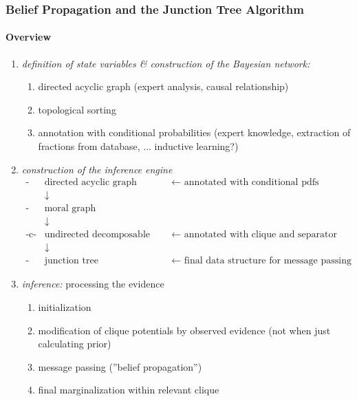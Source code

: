 
\subsubsection{Belief Propagation and the Junction Tree Algorithm}
\paragraph{Overview}
\begin{enumerate}[(1)]
\item  \emph{definition of state variables \& construction of the Bayesian network:}
\begin{enumerate}[-a-]
	\item directed acyclic graph (expert analysis, causal relationship)
	\item topological sorting
	\item annotation with conditional probabilities (expert
          knowledge, extraction of fractions from database, ... inductive learning?)
        \end{enumerate}

\item \emph{ construction of the inference engine}
\[ \begin{array}{ccl}
	\text{-a-} & \text{directed acyclic graph} & \leftarrow \text{ annotated with 
					conditional pdfs} \\
	& \downarrow \\
	\text{-b-} & \text{moral graph}\\
	& \downarrow \\
	\text{-c-} 
& \text{undirected decomposable graphs} & \leftarrow \text{ annotated with
					clique and separator potentials}\\
	& \downarrow \\
	\text{-d-} & \text{junction tree} & \leftarrow \text{ final data structure for 
					message passing}
\end{array} \]

\item \emph{inference:} processing the evidence
\begin{enumerate}[-a-]	
  \item initialization
  \item modification of clique potentials by observed evidence (not when 
  just calculating prior)
  \item message passing (''belief propagation'')
  \item final marginalization within relevant clique
\end{enumerate}
\end{enumerate}


